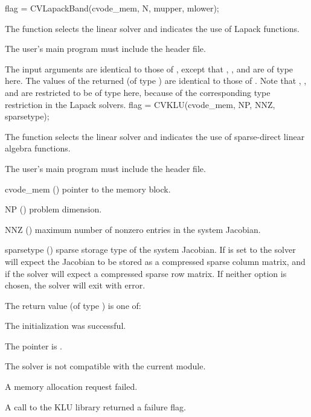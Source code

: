 {
  flag = CVLapackBand(cvode\_mem, N, mupper, mlower);
}
{
  The function  selects the {\cvband} linear solver and
  indicates the use of Lapack functions. 

  The user's main program must include the  header file.
}
{
  The input arguments are identical to those of , except
  that , , and  are of type  here.
}
{
  The values of the returned  (of type ) are identical
  to those of .
}
{
  Note that , , and  are restricted to be of type 
  here, because of the corresponding type restriction in the Lapack solvers.
}
{
  flag = CVKLU(cvode\_mem, NP, NNZ, sparsetype);
}
{
  The function  selects the {\cvklu} linear solver and indicates
  the use of sparse-direct linear algebra functions.

  The user's main program must include the  header file.
}
{
  \begin{args}
  \item[cvode\_mem] ()
    pointer to the {\cvode} memory block.
  \item[NP] ()
    problem dimension.
  \item[NNZ] ()
    maximum number of nonzero entries in the system Jacobian.
  \item[sparsetype] ()
    sparse storage type of the system Jacobian. If  is  
    set to  the solver will expect the Jacobian to be stored as 
    a compressed sparse column matrix, and if  
    the solver will expect a compressed sparse row matrix. 
    If neither option is chosen, the solver will exit with error.
  \end{args}
}
{
  The return value  (of type ) is one of:
  \begin{args}
  \item[\Id{CVSLS\_SUCCESS}] 
    The {\cvklu} initialization was successful.
  \item[\Id{CVSLS\_MEM\_NULL}]
    The  pointer is .
  \item[\Id{CVSLS\_ILL\_INPUT}]
    The {\cvklu} solver is not compatible with the current {\nvector} module.
  \item[\Id{CVSLS\_MEM\_FAIL}]
    A memory allocation request failed.
  \item[\Id{CVSLS\_PACKAGE\_FAIL}]
    A call to the KLU library returned a failure flag.
  \end{args}
}
